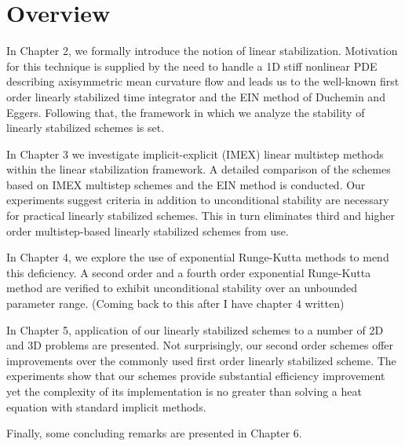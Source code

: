 \section{Overview}
In Chapter 2, we formally introduce the notion of linear stabilization. Motivation for this technique is supplied by the need to handle a 1D stiff nonlinear PDE describing axisymmetric mean curvature flow and leads us to the well-known first order linearly stabilized time integrator and the EIN method of Duchemin and Eggers. Following that, the framework in which we analyze the stability of linearly stabilized schemes is set. 

In Chapter 3 we investigate implicit-explicit (IMEX) linear multistep methods within the linear stabilization framework. A detailed comparison of the schemes based on IMEX multistep schemes and the EIN method is conducted. Our experiments suggest criteria in addition to unconditional stability are necessary for practical linearly stabilized schemes. This in turn eliminates third and higher order multistep-based linearly stabilized schemes from use. 

In Chapter 4, we explore the use of exponential Runge-Kutta methods to mend this deficiency. A second order and a fourth order exponential Runge-Kutta method are verified to exhibit unconditional stability over an unbounded parameter range. (Coming back to this after I have chapter 4 written)

In Chapter 5, application of our linearly stabilized schemes to a number of 2D and 3D problems are presented. Not surprisingly, our second order schemes offer improvements over the commonly used first order linearly stabilized scheme. The experiments show that our schemes provide substantial efficiency improvement yet the complexity of its implementation is no greater than solving a heat equation with standard implicit methods.

Finally, some concluding remarks are presented in Chapter 6.  
 